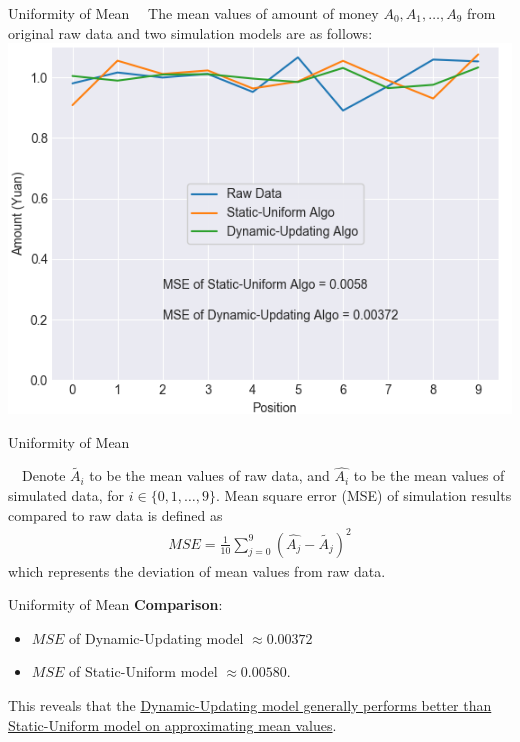 \documentclass[12pt]{beamer}
\renewcommand{\[}{\begin{equation*} \begin{aligned}} %
\renewcommand{\]}{\end{aligned} \end{equation*}}
\begin{document}
\begin{frame}{Uniformity of Mean}
	\ \ The mean values of amount of money $A_0, A_1, \dots , A_9$ from original raw data and two simulation models are as follows: \\[10pt]
	\centering
	\includegraphics[scale=0.5]{result1.png}
\end{frame}

\begin{frame}{Uniformity of Mean}
	\begin{definition}
		\ \ Denote $\tilde{A_i}$ to be the mean values of raw data, and $\hat{A_i}$ to be the mean values of simulated data, for $i \in \{0, 1, \dots ,9\}$. Mean square error (MSE) of simulation results compared to raw data is defined as
		\[
			MSE = \frac{1}{10} \sum_{j=0}^9 (\hat{A_j} - \tilde{A_j})^2
		\]
		which represents the deviation of mean values from raw data.
	\end{definition}
\end{frame}

\begin{frame}{Uniformity of Mean}
	\textbf{Comparison}:
	\begin{itemize}
		\item $MSE$ of Dynamic-Updating model $\approx 0.00372$
		\item $MSE$ of Static-Uniform model $\approx 0.00580$.
	\end{itemize}
	\vspace{8pt}
	This reveals that the \uline{Dynamic-Updating model generally performs better than Static-Uniform model on approximating mean values}.
\end{frame}
\end{document}
